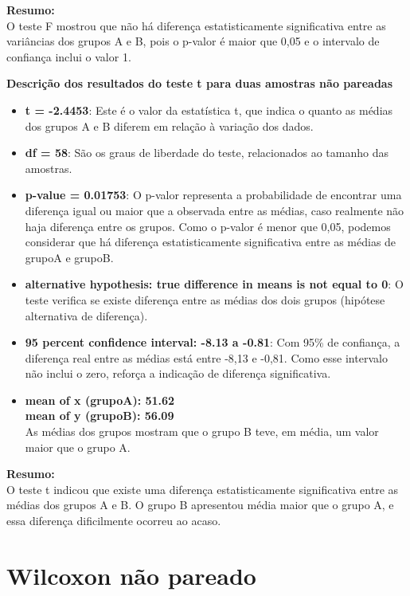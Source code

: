 \documentclass[
]{book}
\providecommand{\tightlist}{%
  \setlength{\itemsep}{0pt}\setlength{\parskip}{0pt}}
\begin{document}
\textbf{Resumo:}\\
O teste F mostrou que não há diferença estatisticamente significativa entre as variâncias dos grupos A e B, pois o p-valor é maior que 0,05 e o intervalo de confiança inclui o valor 1.

\textbf{Descrição dos resultados do teste t para duas amostras não pareadas}

\begin{itemize}
\tightlist
\item
  \textbf{t = -2.4453}: Este é o valor da estatística t, que indica o quanto as médias dos grupos A e B diferem em relação à variação dos dados.
\item
  \textbf{df = 58}: São os graus de liberdade do teste, relacionados ao tamanho das amostras.
\item
  \textbf{p-value = 0.01753}: O p-valor representa a probabilidade de encontrar uma diferença igual ou maior que a observada entre as médias, caso realmente não haja diferença entre os grupos. Como o p-valor é menor que 0,05, podemos considerar que há diferença estatisticamente significativa entre as médias de grupoA e grupoB.
\item
  \textbf{alternative hypothesis: true difference in means is not equal to 0}: O teste verifica se existe diferença entre as médias dos dois grupos (hipótese alternativa de diferença).
\item
  \textbf{95 percent confidence interval: -8.13 a -0.81}: Com 95\% de confiança, a diferença real entre as médias está entre -8,13 e -0,81. Como esse intervalo não inclui o zero, reforça a indicação de diferença significativa.
\item
  \textbf{mean of x (grupoA): 51.62}\\
  \textbf{mean of y (grupoB): 56.09}\\
  As médias dos grupos mostram que o grupo B teve, em média, um valor maior que o grupo A.
\end{itemize}

\textbf{Resumo:}\\
O teste t indicou que existe uma diferença estatisticamente significativa entre as médias dos grupos A e B. O grupo B apresentou média maior que o grupo A, e essa diferença dificilmente ocorreu ao acaso.

\section{Wilcoxon não pareado}\label{wilcoxon-nuxe3o-pareado}
\end{document}
